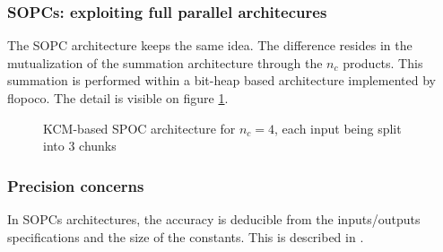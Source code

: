 	\subsubsection{SOPCs: exploiting full parallel architecures}

	The SOPC architecture keeps the same idea.
	The difference resides in the mutualization of the summation architecture through the $n_c$ products.
	This summation is performed within a bit-heap based architecture implemented by flopoco.
	The detail is visible on figure \ref{fig:Overall architecture}.

\begin{figure}
  \begin{center}
\end{center}
\caption{KCM-based SPOC architecture for $n_c=4$, each input being split into 3 chunks  \label{fig:Overall architecture}}
\end{figure}

	\subsubsection{Precision concerns}

	In SOPCs architectures, the accuracy is deducible from the inputs/outputs specifications and the size of the constants.
	This is described in \cite{sums}.

